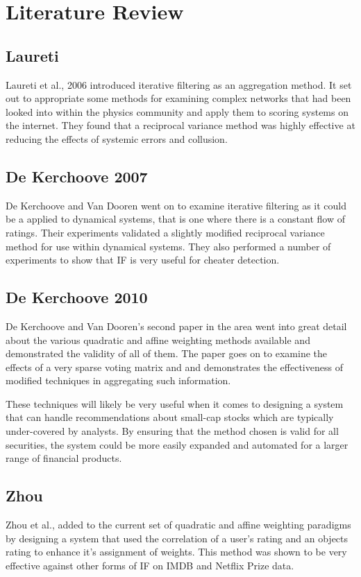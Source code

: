 \chapter{Literature Review}\label{chap:litReview}

\section{Laureti}
Laureti et al., 2006 introduced iterative filtering as an aggregation method. It set out to appropriate some methods for examining complex networks that had been looked into within the physics community and apply them to scoring systems on the internet. They found that a reciprocal variance method was highly effective at reducing the effects of systemic errors and collusion.

\section{De Kerchoove 2007}
De Kerchoove and Van Dooren went on to examine iterative filtering as it could be a applied to dynamical systems, that is one where there is a constant flow of ratings. Their experiments validated a slightly modified reciprocal variance method for use within dynamical systems. They also performed a number of experiments to show that IF is very useful for cheater detection. 

\section{De Kerchoove 2010}
De Kerchoove and Van Dooren's second paper in the area went into great detail about the various quadratic and affine weighting methods available and demonstrated the validity of all of them. The paper goes on to examine the effects of a very sparse voting matrix and and demonstrates the effectiveness of modified techniques in aggregating such information.

These techniques will likely be very useful when it comes to designing a system that can handle recommendations about small-cap stocks which are typically under-covered by analysts. By ensuring that the method chosen is valid for all securities, the system could be more easily expanded and automated for a larger range of financial products.


\section{Zhou}
Zhou et al., added to the current set of quadratic and affine weighting paradigms by designing a system that used the correlation of a user's rating and an objects rating to enhance it's assignment of weights. This method was shown to be very effective against other forms of IF on IMDB and Netflix Prize data.

